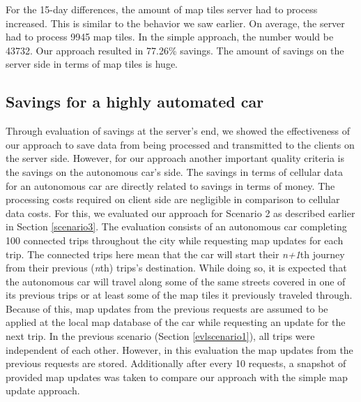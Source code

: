 For the 15-day differences, the amount of map tiles server had to process increased. This is similar to the behavior we saw earlier. On average, the server had to process 9945 map tiles. In the simple approach, the number would be 43732. Our approach resulted in 77.26\% savings. The amount of savings on the server side in terms of map tiles is huge. \\





\subsection{Savings for a highly automated car}
Through evaluation of savings at the server's end, we showed the effectiveness of our approach to save data from being processed and transmitted to the clients on the server side. However, for our approach another important quality criteria is the savings on the autonomous car's side. The savings in terms of cellular data for an autonomous car are directly related to savings in terms of money. The processing costs required on client side are negligible in comparison to cellular data costs. For this, we evaluated our approach for Scenario 2 as described earlier in Section \ref{scenario3}. The evaluation consists of an autonomous car completing 100 connected trips throughout the city while requesting map updates for each trip. The connected trips here mean that the car will start their \textit{n+1}th journey from their previous (\textit{n}th) trips's destination. While doing so, it is expected that the autonomous car will travel along some of the same streets covered in one of its previous trips or at least some of the map tiles it previously traveled through. Because of this, map updates from the previous requests are assumed to be applied at the local map database of the car while requesting an update for the next trip. In the previous scenario (Section \ref{evlscenario1}), all trips were independent of each other. However, in this evaluation the map updates from the previous requests are stored. Additionally after every 10 requests, a snapshot of provided map updates was taken to compare our approach with the simple map update approach. \\

